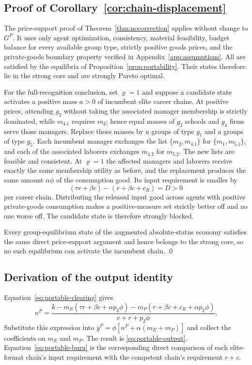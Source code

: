 \documentclass[12pt,letterpaper]{article}
\theoremstyle{definition}
\begin{document}
\subsection{Proof of Corollary~\ref{cor:chain-displacement}}

The price-support proof of Theorem~\ref{thm:nocorrection} applies without change to
$G^P$.
It uses only agent optimization, consistency, material feasibility, budget balance for
every available group type, strictly positive goods prices, and the private-goods
boundary property verified in Appendix~\ref{app:assumptions}.
All are satisfied by the equilibria of Proposition~\ref{prop:portability}.
Their states therefore lie in the strong core and are strongly Pareto optimal.

For the full-recognition conclusion, set $\varrho=1$ and suppose a candidate state
activates a positive mass $a>0$ of incumbent elite career chains.
At positive prices, attending $g_2$ without taking the associated manager membership is
strictly dominated, while $m_{4.1}$ requires $m_2$; hence equal masses of $g_2$ schools
and $g_4$ firms serve those managers.
Replace those masses by $a$ groups of type $g_1$ and $a$ groups of type $g_5$.
Each incumbent manager exchanges the list $\{m_2,m_{4.1}\}$ for
$\{m_1,m_{5.1}\}$, and each of the associated laborers exchanges $m_{4.2}$ for
$m_{5.2}$.
The new lists are feasible and consistent.
At $\varrho=1$ the affected managers and laborers receive exactly the same membership
utility as before, and the replacement produces the same amount $\alpha\phi$ of the
consumption good.
Its input requirement is smaller by
\[
(\tau r+\beta c)-(r+\beta c+c_R)
=D>0
\]
per career chain.
Distributing the released input good across agents with positive private-goods
consumption makes a positive-measure set strictly better off and no one worse off.
The candidate state is therefore strongly blocked.

Every group-equilibrium state of the augmented absolute-status economy satisfies the
same direct price-support argument and hence belongs to the strong core, so no such
equilibrium can activate the incumbent chain.
\qed

\subsection{Derivation of the output identity}

Equation~\eqref{eq:portable-clearing} gives
\[
n^P
=
\frac{k
-m_E(\tau r+\beta c+\alpha p_2\phi)
-m_P(r+\beta c+c_R+\alpha p_2\phi)}
{c+r+p_2\phi}.
\]
Substitute this expression into
$\bar y^P=\phi[n^P+\alpha(m_E+m_P)]$ and collect the coefficients on
$m_E$ and $m_P$.
The result is \eqref{eq:portable-output}.
Equation~\eqref{eq:portable-burn} is the corresponding direct comparison of each
elite-format chain's input requirement with the competent chain's requirement $r+c$.
\end{document}
